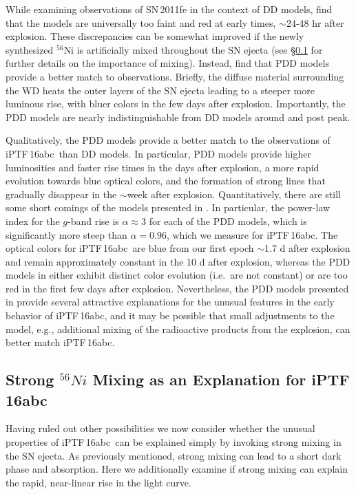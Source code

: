 \documentclass[twocolumn]{aastex61}
\newcommand{\abc}{iPTF\,16abc}
\begin{document}
While examining observations of SN\,2011fe in the context of DD models, \citet{2014MNRAS.441..532D} find that the models are universally too faint and red at early times, $\sim$24-48 hr after explosion. These discrepancies can be somewhat improved if the newly synthesized $^{56}$Ni is artificially mixed throughout the SN ejecta (see \S\ref{sec:Ni_mixing} for further details on the importance of mixing). Instead, \citet{2014MNRAS.441..532D} find that PDD models provide a better match to observations. Briefly, the diffuse material surrounding the WD heats the outer layers of the SN ejecta leading to a steeper more luminous rise, with bluer colors in the few days after explosion. Importantly, the PDD models are nearly indistinguishable from DD models around and post peak. 

Qualitatively, the PDD models provide a better match to the observations of \abc\ than DD models. In particular, PDD models provide higher luminosities and faster rise times in the days after explosion, a more rapid evolution towards blue optical colors, and the formation of strong  lines that gradually disappear in the $\sim$week after explosion. Quantitatively, there are still some short comings of the models presented in \citet{2014MNRAS.441..532D}. In particular, the power-law index for the $g$-band rise is $\alpha \approx 3$ for each of the PDD models, which is significantly more steep than $\alpha = 0.96$, which we measure for \abc. The optical colors for \abc\ are blue from our first epoch $\sim$1.7 d after explosion and remain approximately constant in the 10 d after explosion, whereas the PDD models in \citet{2014MNRAS.441..532D} either exhibit distinct color evolution (i.e.\ are not constant) or are too red in the first few days after explosion. Nevertheless, the PDD models presented in \citet{2014MNRAS.441..532D} provide several attractive explanations for the unusual features in the early behavior of \abc, and it may be possible that small adjustments to the model, e.g., additional mixing of the radioactive products from the explosion, can better match \abc.

\subsection{Strong $^{56}Ni$ Mixing as an Explanation for \abc}
\label{sec:Ni_mixing}

Having ruled out other possibilities we now consider whether the unusual properties of \abc\ can be explained simply by invoking strong mixing in the SN ejecta. As previously mentioned, strong mixing can lead to a short dark phase and  absorption. Here we additionally examine if strong mixing can explain the rapid, near-linear rise in the light curve.
\end{document}
